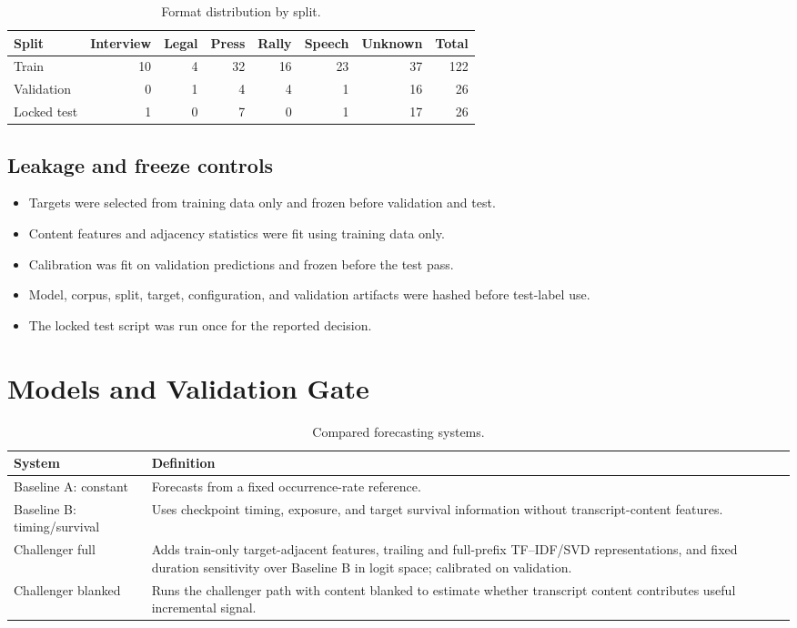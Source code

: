 \documentclass[10pt,a4paper]{article}
\begin{document}
\begin{table}[H]
  \centering
  \caption{Format distribution by split.}
  \small
  \begin{tabular}{@{}lrrrrrrr@{}}
    \toprule
    \textbf{Split} & \textbf{Interview} & \textbf{Legal} &
    \textbf{Press} & \textbf{Rally} & \textbf{Speech} &
    \textbf{Unknown} & \textbf{Total}\\
    \midrule
    Train & 10 & 4 & 32 & 16 & 23 & 37 & 122\\
    Validation & 0 & 1 & 4 & 4 & 1 & 16 & 26\\
    Locked test & 1 & 0 & 7 & 0 & 1 & 17 & 26\\
    \bottomrule
  \end{tabular}
\end{table}

\subsection{Leakage and freeze controls}
\begin{itemize}
  \item Targets were selected from training data only and frozen before validation and test.
  \item Content features and adjacency statistics were fit using training data only.
  \item Calibration was fit on validation predictions and frozen before the test pass.
  \item Model, corpus, split, target, configuration, and validation artifacts were hashed before test-label use.
  \item The locked test script was run once for the reported decision.
\end{itemize}

\section{Models and Validation Gate}

\begin{table}[H]
  \centering
  \caption{Compared forecasting systems.}
  \begin{tabularx}{\textwidth}{@{}L{38mm}Y@{}}
    \toprule
    \textbf{System} & \textbf{Definition}\\
    \midrule
    Baseline A: constant &
      Forecasts from a fixed occurrence-rate reference.\\
    Baseline B: timing/survival &
      Uses checkpoint timing, exposure, and target survival information without
      transcript-content features.\\
    Challenger full &
      Adds train-only target-adjacent features, trailing and full-prefix TF--IDF/SVD
      representations, and fixed duration sensitivity over Baseline B in logit
      space; calibrated on validation.\\
    Challenger blanked &
      Runs the challenger path with content blanked to estimate whether transcript
      content contributes useful incremental signal.\\
    \bottomrule
  \end{tabularx}
\end{table}
\end{document}
